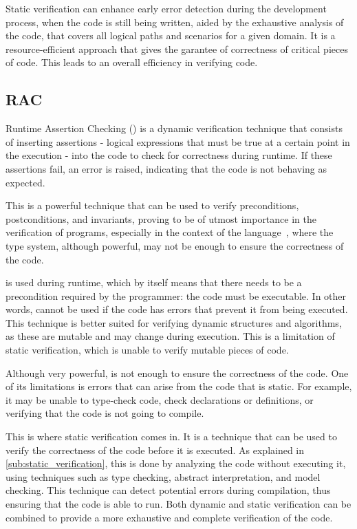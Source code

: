 Static verification can enhance early error detection during the development process, when the code is still 
being written, aided by the exhaustive analysis of the code, that covers all logical paths and scenarios for 
a given domain. It is a resource-efficient approach that gives the garantee of correctness of critical 
pieces of code. This leads to an overall efficiency in verifying code.

\subsection{RAC}
\label{sub:rac}

Runtime Assertion Checking (\rac) is a dynamic verification technique that consists of 
inserting assertions - logical expressions that must be true at a certain point in the 
execution - into the code to check for correctness during runtime. If these assertions fail, 
an error is raised, indicating that the code is not behaving as expected.

This is a powerful technique that can be used to verify preconditions, postconditions, and 
invariants, proving to be of utmost importance in the verification of programs, especially 
in the context of the \ocaml language~\cite{Filliatre_Jean-Christophe}, where the type system, 
although powerful, may not be enough to ensure the correctness of the code.

\rac is used during runtime, which by itself means that there needs to be a precondition required 
by the programmer: the code must be executable. In other words, \rac cannot be used if the code 
has errors that prevent it from being executed. This technique is better suited for verifying dynamic 
structures and algorithms, as these are mutable and may change during execution. This is a limitation 
of static verification, which is unable to verify mutable pieces of code.

Although very powerful, \rac is not enough to ensure the correctness of the code. One of its 
limitations is errors that can arise from the code that is static. For example, it may be unable 
to type-check code, check declarations or definitions, or verifying that the code is not going to 
compile.

This is where static verification comes in. It is a technique that can be used to verify the 
correctness of the code before it is executed. As explained in \ref{sub:static_verification}, this is done by analyzing the code without 
executing it, using techniques such as type checking, abstract interpretation, and model checking.
This technique can detect potential errors during compilation, thus ensuring that the code is 
able to run. Both dynamic and static verification can be combined to provide a more exhaustive 
and complete verification of the code.

